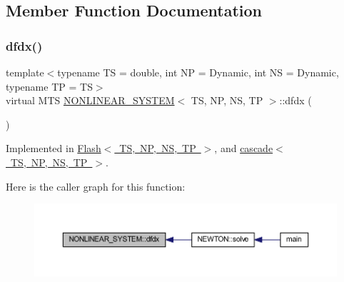 \subsection{Member Function Documentation}
\mbox{\label{class_n_o_n_l_i_n_e_a_r___s_y_s_t_e_m_a531f56bcbc77f2219164af40aa16fad2}} 
\subsubsection{\texorpdfstring{dfdx()}{dfdx()}}
{\footnotesize\ttfamily template$<$typename TS = double, int NP = Dynamic, int NS = Dynamic, typename TP = TS$>$ \\
virtual M\+TS \mbox{\hyperlink{class_n_o_n_l_i_n_e_a_r___s_y_s_t_e_m}{N\+O\+N\+L\+I\+N\+E\+A\+R\+\_\+\+S\+Y\+S\+T\+EM}}$<$ TS, NP, NS, TP $>$\+::dfdx (\begin{DoxyParamCaption}{ }\end{DoxyParamCaption})\hspace{0.3cm}{\ttfamily [pure virtual]}}



Implemented in \mbox{\hyperlink{class_flash_a83e35b3ab13b3705f0fe06c40b800a8b}{Flash$<$ T\+S, N\+P, N\+S, T\+P $>$}}, and \mbox{\hyperlink{classcascade_ac72705f0ad01cc88d43c002d63acce13}{cascade$<$ T\+S, N\+P, N\+S, T\+P $>$}}.

Here is the caller graph for this function\+:\nopagebreak
\begin{figure}[H]
\begin{center}
\leavevmode
\includegraphics[width=350pt]{class_n_o_n_l_i_n_e_a_r___s_y_s_t_e_m_a531f56bcbc77f2219164af40aa16fad2_icgraph}
\end{center}
\end{figure}
\mbox{\label{class_n_o_n_l_i_n_e_a_r___s_y_s_t_e_m_a65827d7df297f26cd3f14f472a212077}} 
